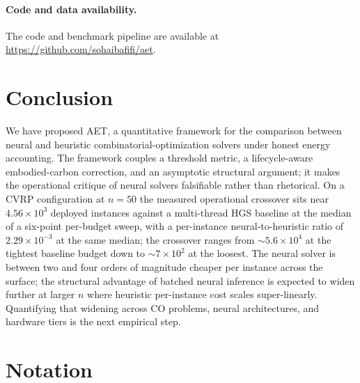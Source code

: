 \documentclass[11pt]{article}
\newcommand{\AET}{AET}
\begin{document}
\paragraph{Code and data availability.} The code and benchmark pipeline are available at \url{https://github.com/sohaibafifi/aet}.

\section{Conclusion}
\label{sec:conclusion}

We have proposed \AET, a quantitative framework for the comparison between neural and heuristic combinatorial-optimization solvers under honest energy accounting. The framework couples a threshold metric, a lifecycle-aware embodied-carbon correction, and an asymptotic structural argument; it makes the operational critique of neural solvers falsifiable rather than rhetorical. On a CVRP configuration at \(n=50\) the measured operational crossover sits near \(4.56 \times 10^{3}\) deployed instances against a multi-thread HGS baseline at the median of a six-point per-budget sweep, with a per-instance neural-to-heuristic ratio of \(2.29\times10^{-3}\) at the same median; the crossover ranges from \(\sim\!5.6\times10^{4}\) at the tightest baseline budget down to \(\sim\!7\times10^{2}\) at the loosest. The neural solver is between two and four orders of magnitude cheaper per instance across the surface; the structural advantage of batched neural inference is expected to widen further at larger \(n\) where heuristic per-instance cost scales super-linearly. Quantifying that widening across CO problems, neural architectures, and hardware tiers is the next empirical step.




\appendix

\section{Notation}
\label{app:notation}
\end{document}
